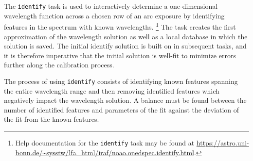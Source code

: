 The \texttt{identify} task is used to interactively determine a one-dimensional wavelength function across a chosen row of an arc exposure by identifying features in the spectrum with known wavelengths.%
\footnote{Help documentation for the \texttt{identify} task may be found at \url{https://astro.uni-bonn.de/~sysstw/lfa_html/iraf/noao.onedspec.identify.html}.}
The task creates the first approximation of the wavelength solution as well as a local database in which the solution is saved. The initial identify solution is built on in subsequent tasks, and it is therefore imperative that the initial solution is well-fit to minimize errors further along the calibration process.

The process of using \texttt{identify} consists of identifying known features spanning the entire wavelength range and then removing identified features which negatively impact the wavelength solution. A balance must be found between the number of identified features and parameters of the fit against the deviation of the fit from the known features.

